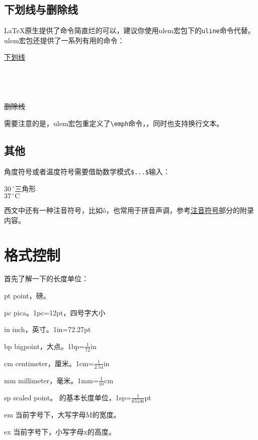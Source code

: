 {\subsection{下划线与删除线}
\LaTeX 原生提供了\latexline{\\underline}命令简直烂的可以，建议你使用ulem宏包下的\texttt{uline}命令代替。ulem宏包还提供了一系列有用的命令：

\begin{codeshow}
\uline{下划线} \\
 \\
 \\
 \\
 \\
\sout{删除线} \\
\end{codeshow}

需要注意的是，ulem宏包重定义了\verb|\emph|命令，，同时也支持换行文本。

\subsection{其他}
角度符号或者温度符号需要借助数学模式\verb|$...$|输入：

\begin{codeshow}
$30\,^{\circ}$三角形 \\
$37\,^{\circ}\mathrm{C}$
\end{codeshow}

西文中还有一种注音符号，比如\^o，也常用于拼音声调，参考\hyperref[app:phonetic]{注音符号}部分的附录内容。

\section{格式控制}
首先了解一下的长度单位：
\begin{fead}
  \item[pt] point，磅。
  \item[pc] pica。1pc=12pt，四号字大小
  \item[in] inch，英寸。1in=72.27pt
  \item[bp] bigpoint，大点。1bp=$\frac{1}{72}$in
  \item[cm] centimeter，厘米。1cm=$\frac{1}{2.54}$in
  \item[mm] millimeter，毫米。1mm=$\frac{1}{10}$cm
  \item[sp] scaled point。 的基本长度单位，1sp=$\frac{1}{65536}$pt
  \item[em] 当前字号下，大写字母M的宽度。
  \item[ex] 当前字号下，小写字母x的高度。
\end{fead}

}
